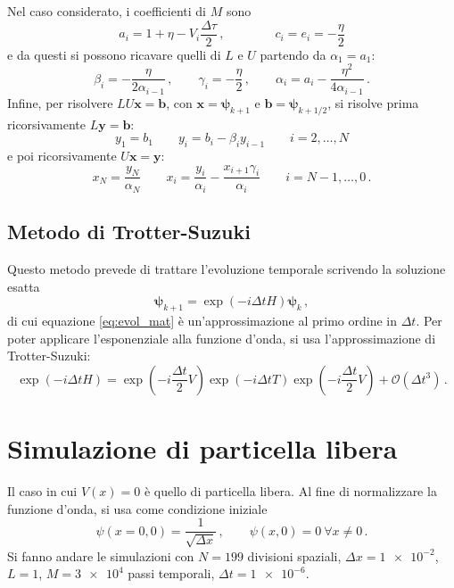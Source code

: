 \documentclass[a4paper, titlepage]{article}
\numberwithin{equation}{section}
\begin{document}
Nel caso considerato, i coefficienti di $M$ sono
\begin{equation*}
    a_i = 1 + \eta - V_i \frac{\Delta\tau}{2}\, , \qquad\qquad
    c_i = e_i = -\frac{\eta}{2}
\end{equation*}
e da questi si possono ricavare quelli di $L$ e $U$ partendo da $\alpha_1 = a_1$:
\begin{equation}
    \beta_i = -\frac{\eta}{2\alpha_{i-1}}\, ,
    \qquad
    \gamma_i = -\frac{\eta}{2}\, ,
    \qquad
    \alpha_i = a_i - \frac{\eta^2}{4\alpha_{i-1}}\, .
    \label{eq:recZ}
\end{equation}
Infine, per risolvere $LU\mathbf{x} = \mathbf{b}$, con $\mathbf{x} = \bm{\psi}_{k+1}$ e $\mathbf{b} = \bm{\psi}_{k+1/2}$, si risolve prima ricorsivamente $L\mathbf{y} = \mathbf{b}$:
\begin{equation}
    y_1 = b_1 \qquad y_i = b_i -\beta_i y_{i-1} \qquad i = 2,\dots,N
    \label{eq:recA}
\end{equation}
e poi ricorsivamente $U\mathbf{x} = \mathbf{y}$:
\begin{equation}
    x_N = \frac{y_N}{\alpha_N} \qquad x_i = \frac{y_i}{\alpha_i} - \frac{x_{i+1}\gamma_i}{\alpha_i} \qquad i = N-1,\dots,0\, .
    \label{eq:recB}
\end{equation}

\subsection{Metodo di Trotter-Suzuki}
Questo metodo prevede di trattare l'evoluzione temporale scrivendo la soluzione esatta
\begin{equation*}
    \bm{\psi}_{k+1} = \exp(-i\Delta t H)\bm{\psi}_k\, ,
\end{equation*}
di cui equazione \eqref{eq:evol_mat} è un'approssimazione al primo ordine in $\Delta t$. Per poter applicare l'esponenziale alla funzione d'onda, si usa l'approssimazione di Trotter-Suzuki:
\begin{equation*}
    \exp(-i \Delta t H) = \exp\left(-i \frac{\Delta t}{2} V\right) \exp(-i \Delta t T) \exp\left(-i \frac{\Delta t}{2} V\right) + \mathcal{O}(\Delta t^3)\, .
\end{equation*}






\section{Simulazione di particella libera}
Il caso in cui $V(x) = 0$ è quello di particella libera. Al fine di normalizzare la funzione d'onda, si usa come condizione iniziale
\begin{equation}
    \psi(x = 0, 0) = \frac{1}{\sqrt{\Delta x}}\, ,
    \qquad
    \psi(x,0) = 0\ \forall x \neq 0\, .
    \label{eq:initial}
\end{equation}
Si fanno andare le simulazioni con $N = 199$ divisioni spaziali, $\Delta x = \num{1e-2}$, $L=1$, $M = \num{3e4}$ passi temporali, $\Delta t = \num{1e-6}$. 
\end{document}
